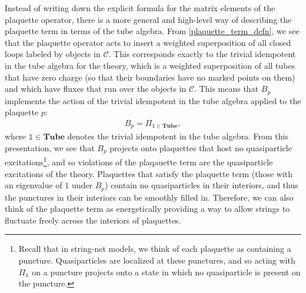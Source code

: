 \documentclass[12pt,a4paper]{article}
\newcounter{arrow}
\newcommand{\unit}{\mathds{1}}
\newcommand{\mcc}{\mathcal{C}}
\newcommand{\tube}{\textbf{Tube}}
\newcommand{\kw}[1]{{\color{kwcolor}\footnotesize{(KW) #1}}}
\newcommand{\dave}[1]{{\color{ao(english)}\footnotesize{(DA) #1}}}
\newcommand{\ethan}[1]{{\color{amethyst}\footnotesize{(EL) #1}}}
\newcommand{\Bpa}{\mathord{\vcenter{\hbox{\texttt{[image: Bpa.pdf]}}}}}
\newcommand{\Bpb}{\mathord{\vcenter{\hbox{\texttt{[image: Bpb.pdf]}}}}}
\newcommand{\Bpc}{\mathord{\vcenter{\hbox{\texttt{[image: Bpc.pdf]}}}}}
\newcommand{\Bpd}{\mathord{\vcenter{\hbox{\texttt{[image: Bpd.pdf]}}}}}
\newcommand{\Bpe}{\mathord{\vcenter{\hbox{\texttt{[image: Bpe.pdf]}}}}}
\newcommand{\Bpf}{\mathord{\vcenter{\hbox{\texttt{[image: Bpf.pdf]}}}}}
\newcommand{\Bpg}{\mathord{\vcenter{\hbox{\texttt{[image: Bpg.pdf]}}}}}
\newcommand{\Bph}{\mathord{\vcenter{\hbox{\texttt{[image: Bph.pdf]}}}}}
\newcommand{\Bpi}{\mathord{\vcenter{\hbox{\texttt{[image: Bpi.pdf]}}}}}
\newcommand{\PlaquettePrime}{\mathord{\vcenter{\hbox{\texttt{[image: PlaquettePrime.pdf]}}}}}
\begin{document}
Instead of writing down the explicit formula for the matrix elements of the plaquette operator, there is a 
more general and high-level way of describing the plaquette term in terms of the tube algebra.
From \eqref{plaquette_term_defn}, we see that the plaquette operator acts to insert a 
weighted superposition of all closed loops labeled by objects in $\mcc$.
This corresponds exactly to the trivial idempotent in the tube algebra for the theory, 
which is a weighted superposition of all tubes that have zero charge (so that their boundaries have no marked points on them) and which have fluxes that run over the objects in $\mcc$.
This means that $B_p$ implements the action of the trivial idempotent in the tube algebra applied to the plaquette $p$:
\begin{align}
B_{p} = \Pi_{\unit \in \tube},
\end{align}
where $\unit\in\tube$ denotes the trivial idempotent in the tube algebra. 
From this presentation, we see that $B_p$ projects onto plaquettes that host no quasiparticle excitations\footnote{Recall that in 
string-net models, we think of each plaquette as containing a puncture. Quasiparticles are localized at 
these punctures, and so acting with $\Pi_\unit$ on a puncture projects onto a state in which no 
quasiparticle is present on the puncture.}, 
and so violations of the plaqauette term are the quasiparticle excitations of the theory. 
Plaquettes that satisfy the plaquette term (those with an eigenvalue of $1$ under $B_p$) contain no 
quasiparticles in their interiors, and thus the punctures in their interiors can be smoothly filled in. 
Therefore, we can also think of the plaquette term as energetically providing a way to allow strings to 
fluctuate freely across the interiors of plaquettes. 


\end{document}
